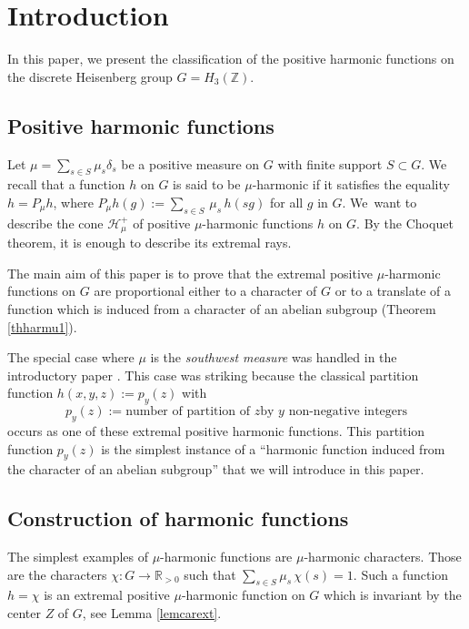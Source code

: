 \documentclass[11pt]{article}
\numberwithin{equation}{section}
\let\mathcal\mathscr
\theoremstyle{definition}
\newcommand{\m}[1]{\mathbb{ #1}}
\newcommand{\mc}[1]{\mathcal{ #1}}
\let\de\delta
\let\ra\to
\begin{document}
\section{Introduction}

In this paper, we present the classification
of the positive harmonic functions
on the discrete Heisenberg group $G=H_3(\m Z)$.

\subsection{Positive harmonic functions}

Let $\mu=\sum_{s\in S} \mu_s \de_s$ be a positive measure on $G$
with finite support $S\subset G$.
We recall that a function $h$ on $G$ is said to be $\mu$-harmonic
if it satisfies the equality
$h= P_\mu h$, where $P_\mu h(g):= \sum_{s\in S} \,\mu_s\, h(sg)$ for all $g$ in $G$.
We~want to describe the cone $\mc H_\mu^+$ of positive $\mu$-harmonic functions $h$ on $G$.
By the Choquet theorem, it is enough to describe its extremal rays.

The main aim of this paper is to prove
that the extremal positive $\mu$-harmonic functions
on $G$ are proportional
either to a character of $G$ or to a translate of a function which is induced
from a character of an abelian subgroup (Theorem \ref{thharmu1}).

The special case
where $\mu$ is the {\it southwest measure} was handled in
the introductory paper
\cite{BenoistHeisenberg1}.
This case was striking because the classical partition
function $h(x,y,z):=p_y(z)$ with
\[
p_y(z):=
\text{number of partition of $z$
by $y$ non-negative integers}
\]
occurs as one of these extremal
positive harmonic functions.
This partition function $p_y(z)$ is the simplest instance
of a ``harmonic function induced
from the character of an abelian subgroup''
that we will introduce in this paper.

\subsection{Construction of harmonic functions}
\label{secincoha}
The simplest examples of $\mu$-harmonic functions are $\mu$-harmonic characters.
Those are the
characters
$\chi: G\ra \m R_{>0}$ such that $\sum_{s\in S}\mu_s\,\chi(s)=1$.
Such a function
$h=\chi$ is an
extremal positive $\mu$-harmonic function on $G$ which is invariant by the center $Z$ of $G$,
see Lemma \ref{lemcarext}.
\end{document}
